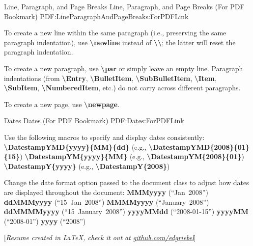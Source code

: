 \documentclass[letterpaper,MMMMyyyy,nonstopmode]{simpleresumecv}
\newcommand{\CVNote}{Resume created in \LaTeX, check it out at \href{https://github.com/edgriebel/resume-cv}{\underline{github.com/edgriebel}}}
\newcommand{\Code}[1]{\mbox{\textbf{#1}}}
\newcommand{\CodeCommand}[1]{\mbox{\textbf{\textbackslash{#1}}}}
\begin{document}
\begin{Body}
\BigGap
\SubSection
{Line, Paragraph, and Page Breaks}
{Line, Paragraph, and Page Breaks (For PDF Bookmark)}
{PDF:LineParagraphAndPageBreaks:ForPDFLink}

\Gap
\BulletItem
To create a new line within the same paragraph (i.e., preserving the same paragraph indentation), use \CodeCommand{newline} instead of \CodeCommand{\textbackslash};
the latter will reset the paragraph indentation.

\Gap
\BulletItem
To create a new paragraph, use \CodeCommand{par} or simply leave an empty line.
Paragraph indentations (from
\CodeCommand{Entry},
\CodeCommand{BulletItem},
\CodeCommand{SubBulletItem},
\CodeCommand{Item},
\CodeCommand{SubItem},
\CodeCommand{NumberedItem},
etc.) do not carry across different paragraphs.

\Gap
\BulletItem
To create a new page, use \CodeCommand{newpage}.

\BigGap
\SubSection
{Dates}
{Dates (For PDF Bookmark)}
{PDF:Dates:ForPDFLink}

\Gap
\BulletItem
Use the following macros to specify and display dates consistently:
\SubBulletItem
\CodeCommand{DatestampYMD\{yyyy\}\{MM\}\{dd\}}
(e.g., \CodeCommand{DatestampYMD\{2008\}\{01\}\{15\}})
\SubBulletItem
\CodeCommand{DatestampYM\{yyyy\}\{MM\}}
(e.g., \CodeCommand{DatestampYM\{2008\}\{01\}})
\SubBulletItem
\CodeCommand{DatestampY\{yyyy\}}
(e.g., \CodeCommand{DatestampY\{2008\}})

\Gap
\BulletItem
Change the date format option passed to the document class to adjust how dates are displayed throughout the document:
\SubBulletItem
\Code{MMMyyyy} (``Jan~2008'')
\SubBulletItem
\Code{ddMMMyyyy} (``15~Jan~2008'')
\SubBulletItem
\Code{MMMMyyyy} (``January~2008'')
\SubBulletItem
\Code{ddMMMMyyyy} (``15~January~2008'')
\SubBulletItem
\Code{yyyyMMdd} (``2008-01-15'')
\SubBulletItem
\Code{yyyyMM} (``2008-01'')
\SubBulletItem
\Code{yyyy} (``2008'')

\endgroup

\fi

\end{Body}


\UseNoteFont%
\null\hfill%
[\textit{\CVNote}]
\end{document}
